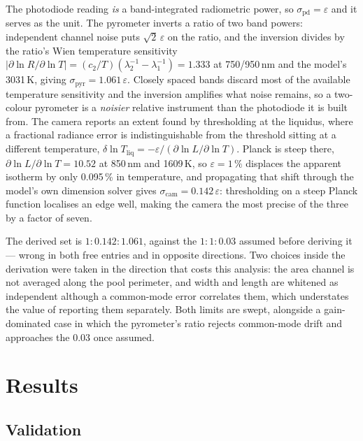 \documentclass[final,5p,times,twocolumn]{elsarticle}
\begin{document}
The photodiode reading \emph{is} a band-integrated radiometric power, so
$\sigma_{\mathrm{pd}} = \varepsilon$ and it serves as the unit. The pyrometer
inverts a ratio of two band powers: independent channel noise puts
$\sqrt{2}\,\varepsilon$ on the ratio, and the inversion divides by the ratio's
Wien temperature sensitivity $|\partial \ln R/\partial \ln T| = (c_2/T)
(\lambda_2^{-1}-\lambda_1^{-1}) = 1.333$ at 750/950\,nm and the model's 3031\,K,
giving $\sigma_{\mathrm{pyr}} = 1.061\,\varepsilon$. Closely spaced bands discard most of the
available temperature sensitivity and the inversion amplifies what noise remains,
so a two-colour pyrometer is a \emph{noisier} relative instrument than the
photodiode it is built from. The camera reports an extent found
by thresholding at the liquidus, where a fractional radiance error is
indistinguishable from the threshold sitting at a different temperature,
$\delta \ln T_{\mathrm{liq}} = -\varepsilon/(\partial \ln L/\partial \ln T)$.
Planck is steep there, $\partial \ln L/\partial \ln T = 10.52$ at 850\,nm and
1609\,K, so $\varepsilon = 1\,\%$ displaces the apparent isotherm by only
0.095\,\% in temperature, and propagating that shift through the model's own
dimension solver gives $\sigma_{\mathrm{cam}} = 0.142\,\varepsilon$: thresholding
on a steep Planck function localises an edge well, making the camera the most
precise of the three by a factor of seven.

The derived set is $1 : 0.142 : 1.061$, against the $1 : 1 : 0.03$ assumed before
deriving it --- wrong in both free entries and in opposite directions. Two choices
inside the derivation were taken in the direction that costs this analysis: the
area channel is not averaged along the pool perimeter, and width and length are
whitened as independent although a common-mode error correlates them, which
understates the value of reporting them separately. Both limits are swept,
alongside a gain-dominated case in which the pyrometer's ratio rejects
common-mode drift and approaches the 0.03 once assumed.

\section{Results}

\subsection{Validation}
\label{sec:valid}
\end{document}
